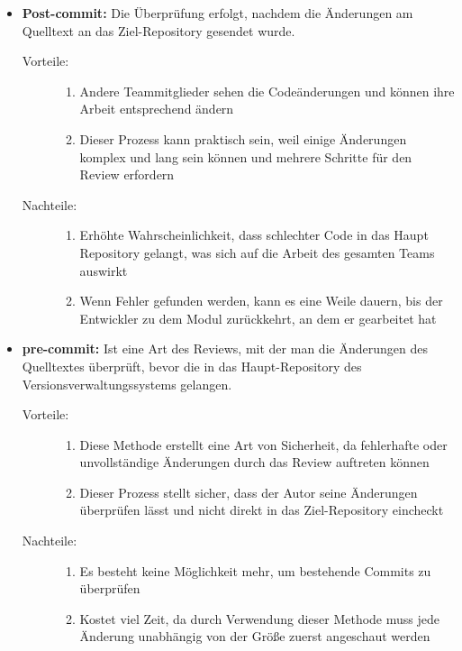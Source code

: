 \begin{description}
	\begin{itemize}	
	\item \textbf{Post-commit:}
		Die Überprüfung erfolgt, nachdem die Änderungen am Quelltext an das Ziel-Repository gesendet wurde.
		\begin{description}
			\item [Vorteile:] \hfill
			\begin{enumerate}
				\item Andere Teammitglieder sehen die Codeänderungen und können ihre Arbeit entsprechend ändern
				\item Dieser Prozess kann praktisch sein, weil einige Änderungen komplex und lang sein können und mehrere Schritte für den Review erfordern
			\end{enumerate}
			
			\item[Nachteile:] \hfill
			\begin{enumerate}
				\item Erhöhte Wahrscheinlichkeit, dass schlechter Code in das Haupt Repository gelangt, was sich auf die Arbeit des gesamten Teams auswirkt
				\item Wenn Fehler gefunden werden, kann es eine Weile dauern, bis der Entwickler zu dem Modul zurückkehrt, an dem er gearbeitet hat
			\end{enumerate}
		\end{description}
		
	\item \textbf{pre-commit:}
		Ist eine Art des Reviews, mit der man die Änderungen des Quelltextes überprüft, bevor die in das Haupt-Repository des Versionsverwaltungssystems gelangen.
		\begin{description}
		
			\item [Vorteile:] \hfill
			\begin{enumerate}
				\item Diese Methode erstellt eine Art von Sicherheit, da fehlerhafte oder unvollständige Änderungen durch das Review auftreten können
				\item Dieser Prozess stellt sicher, dass der Autor seine Änderungen überprüfen lässt und nicht direkt in das Ziel-Repository eincheckt
			\end{enumerate}
		
			\item [Nachteile:] \hfill
			\begin{enumerate}
				\item Es besteht keine Möglichkeit mehr, um bestehende Commits zu überprüfen
				\item Kostet viel Zeit, da durch Verwendung dieser Methode muss jede Änderung unabhängig von der Größe zuerst angeschaut werden
			\end{enumerate}
			

\end{description}
\end{itemize}
\end{description}
